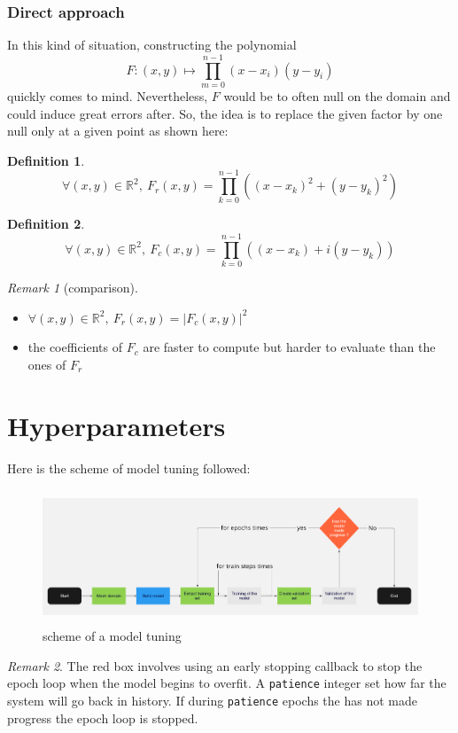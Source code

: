 \documentclass{article}
\theoremstyle{definition}
\newtheorem{definition}{Definition}[section]
\theoremstyle{property}
\theoremstyle{remark}
\newtheorem*{remark}{Remark}
\begin{document}
	
	\subsubsection{Direct approach}
	In this kind of situation, constructing the polynomial $$F:(x,y)\mapsto\prod_{m=0}^{n-1}(x-x_i)(y-y_i)$$ quickly comes to mind. Nevertheless, $F$ would be to often null on the domain and could induce great errors after. So, the idea is to replace the given factor by one null only at a given point as shown here:
	\begin{definition}\label{F_real}
		$$\forall (x,y)\in\mathbb{R}^2,~F_r(x,y) = \prod_{k=0}^{n-1}((x-x_k)^2 + (y-y_k)^2)$$
	\end{definition}
	
	\begin{definition}\label{F_comp}
		$$\forall (x,y)\in\mathbb{R}^2,~F_c(x,y) = \prod_{k=0}^{n-1}((x-x_k) + i(y-y_k))$$
	\end{definition}
	
	\begin{remark}[comparison]\
		\begin{itemize}
			\item $\forall (x,y)\in\mathbb{R}^2,~F_r(x,y)=\vert F_c(x,y) \vert^2$
			\item the coefficients of $F_c$ are faster to compute but harder to evaluate than the ones of $F_r$
		\end{itemize}
		
	\end{remark}
	
	\newpage
	\section{Hyperparameters}
	Here is the scheme of model tuning followed:
	\begin{figure}[h]
		\includegraphics[width=13cm, height=4cm]{tuning_model.png}
		\centering
		\caption{scheme of a model tuning}
	\end{figure}
	\begin{remark}
		The red box involves using an early stopping callback to stop the epoch loop when the model begins to overfit. A \texttt{patience} integer set how far the system will go back in history. If during \texttt{patience} epochs the has not made progress the epoch loop is stopped.
	\end{remark}
	
\end{document}
